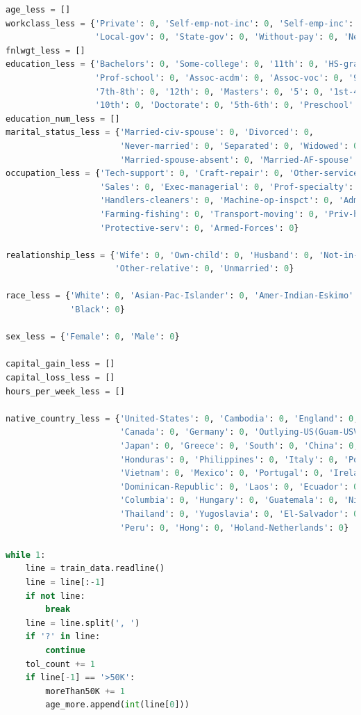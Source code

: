 ﻿\documentclass[a4paper, 11pt]{article}
\begin{document}
\begin{lstlisting}[language=Python,frame=single]
age_less = []
workclass_less = {'Private': 0, 'Self-emp-not-inc': 0, 'Self-emp-inc': 0, 'Federal-gov': 0,
                  'Local-gov': 0, 'State-gov': 0, 'Without-pay': 0, 'Never-worked': 0}
fnlwgt_less = []
education_less = {'Bachelors': 0, 'Some-college': 0, '11th': 0, 'HS-grad': 0,
                  'Prof-school': 0, 'Assoc-acdm': 0, 'Assoc-voc': 0, '9th': 0,
                  '7th-8th': 0, '12th': 0, 'Masters': 0, '5': 0, '1st-4th': 0,
                  '10th': 0, 'Doctorate': 0, '5th-6th': 0, 'Preschool': 0}
education_num_less = []
marital_status_less = {'Married-civ-spouse': 0, 'Divorced': 0,
                       'Never-married': 0, 'Separated': 0, 'Widowed': 0,
                       'Married-spouse-absent': 0, 'Married-AF-spouse': 0}
occupation_less = {'Tech-support': 0, 'Craft-repair': 0, 'Other-service': 0,
                   'Sales': 0, 'Exec-managerial': 0, 'Prof-specialty': 0,
                   'Handlers-cleaners': 0, 'Machine-op-inspct': 0, 'Adm-clerical': 0,
                   'Farming-fishing': 0, 'Transport-moving': 0, 'Priv-house-serv': 0,
                   'Protective-serv': 0, 'Armed-Forces': 0}

realationship_less = {'Wife': 0, 'Own-child': 0, 'Husband': 0, 'Not-in-family': 0,
                      'Other-relative': 0, 'Unmarried': 0}

race_less = {'White': 0, 'Asian-Pac-Islander': 0, 'Amer-Indian-Eskimo': 0, 'Other': 0,
             'Black': 0}

sex_less = {'Female': 0, 'Male': 0}

capital_gain_less = []
capital_loss_less = []
hours_per_week_less = []

native_country_less = {'United-States': 0, 'Cambodia': 0, 'England': 0, 'Puerto-Rico': 0,
                       'Canada': 0, 'Germany': 0, 'Outlying-US(Guam-USVI-etc)': 0, 'India': 0,
                       'Japan': 0, 'Greece': 0, 'South': 0, 'China': 0, 'Cuba': 0, 'Iran': 0,
                       'Honduras': 0, 'Philippines': 0, 'Italy': 0, 'Poland': 0, 'Jamaica': 0,
                       'Vietnam': 0, 'Mexico': 0, 'Portugal': 0, 'Ireland': 0, 'France': 0,
                       'Dominican-Republic': 0, 'Laos': 0, 'Ecuador': 0, 'Taiwan': 0, 'Haiti': 0,
                       'Columbia': 0, 'Hungary': 0, 'Guatemala': 0, 'Nicaragua': 0, 'Scotland': 0,
                       'Thailand': 0, 'Yugoslavia': 0, 'El-Salvador': 0, 'Trinadad&Tobago': 0,
                       'Peru': 0, 'Hong': 0, 'Holand-Netherlands': 0}

while 1:
    line = train_data.readline()
    line = line[:-1]
    if not line:
        break
    line = line.split(', ')
    if '?' in line:
        continue
    tol_count += 1
    if line[-1] == '>50K':
        moreThan50K += 1
        age_more.append(int(line[0]))


\end{lstlisting}
\end{document}
